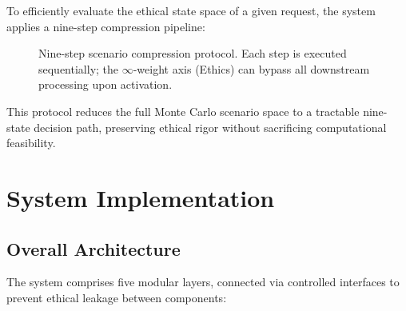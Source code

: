 \documentclass[conference]{IEEEtran}
\begin{document}
To efficiently evaluate the ethical state space of a given
request, the system applies a nine-step compression pipeline:

\begin{figure}[!ht]
\centering
{}
\caption{Nine-step scenario compression protocol. Each
  step is executed sequentially; the $\infty$-weight axis
  (Ethics) can bypass all downstream processing upon
  activation.}
\label{fig:nine_step}
\end{figure}

This protocol reduces the full Monte Carlo scenario space
to a tractable nine-state decision path, preserving ethical
rigor without sacrificing computational feasibility.

\section{System Implementation}

\subsection{Overall Architecture}

The system comprises five modular layers, connected via
controlled interfaces to prevent ethical leakage between
components:
\end{document}
